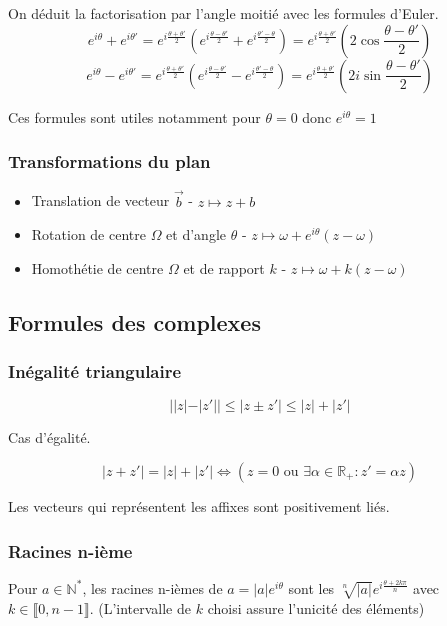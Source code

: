 \documentclass[openany]{book}
\begin{document}
On déduit la factorisation par l'angle moitié avec les formules d'Euler.
\[ e^{i\theta}+e^{i\theta'} = e^{i\frac{\theta+\theta'}{2}}(e^{i\frac{\theta-\theta'}{2}} + e^{i\frac{\theta'-\theta}{2}}) = e^{i\frac{\theta+\theta'}{2}}(2\cos{\frac{\theta-\theta'}{2}}) \]  
\[ e^{i\theta}-e^{i\theta'} = e^{i\frac{\theta+\theta'}{2}}(e^{i\frac{\theta-\theta'}{2}} - e^{i\frac{\theta'-\theta}{2}}) = e^{i\frac{\theta+\theta'}{2}}(2i\sin{\frac{\theta-\theta'}{2}}) \]

Ces formules sont utiles notamment pour $ \theta=0 $ donc $ e^{i\theta} = 1 $

\subsubsection{Transformations du plan}

\begin{itemize}
    \item Translation de vecteur $ \vec{b} $ - $ z \mapsto z+b $
    \item Rotation de centre $ \Omega $ et d'angle $ \theta $ - $ z \mapsto \omega + e^{i\theta}(z-\omega) $
    \item Homothétie de centre $ \Omega $ et de rapport $ k $ - $ z \mapsto \omega + k(z-\omega) $
\end{itemize}

\subsection{Formules des complexes}
\subsubsection{Inégalité triangulaire}
\[ ||z|-|z'|| \leq |z \pm z'| \leq |z|+|z'| \]

Cas d'égalité. 

\[ |z+z'|=|z|+|z'| \iff (z=0 \text{ ou } \exists \alpha \in \mathbb{R}_+ : z'=\alpha z) \]

Les vecteurs qui représentent les affixes sont positivement liés. \\

\subsubsection{Racines n-ième}
Pour $a\in \mathbb{N}^*$, les racines n-ièmes de $ a = |a|e^{i\theta}$ sont les $ \sqrt[n]{|a|}e^{i\frac{\theta + 2k\pi}{n}} $ avec $ k \in \llbracket 0, n-1\rrbracket $. (L'intervalle de $k$ choisi assure l'unicité des éléments) \\
\end{document}
